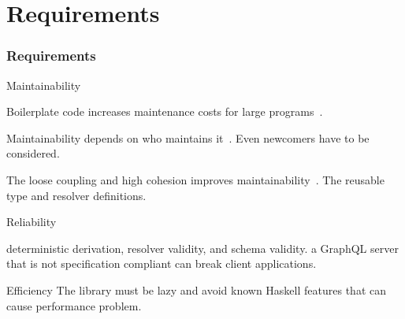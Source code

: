 \section{Requirements}

\begin{frame}[allowframebreaks]\frametitle{Requirements}  

\begin{block}{Maintainability}



\begin{itemize}

     Boilerplate code increases maintenance costs for large programs~\cite{scrap-your-boilerplate}.

     Maintainability depends on who maintains it~\cite{contr-reduce-maintainability}. Even newcomers have to be considered.

     The loose coupling and high cohesion improves maintainability~\cite{arc-modularity}. The reusable type and resolver definitions. 
    
\end{itemize}
\end{block}

\begin{block}{Reliability}

\begin{itemize}
     deterministic derivation, resolver validity, and schema validity.    
     a GraphQL server that is not specification compliant can break client applications.
\end{itemize}

\end{block}

\begin{block}{Efficiency}
The library must be lazy and avoid known Haskell features that can cause  performance problem.
\end{block}

\end{frame}